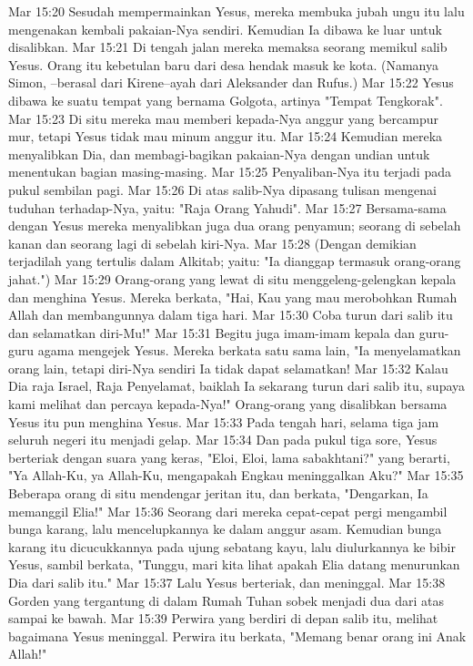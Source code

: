 Mar 15:20  Sesudah mempermainkan Yesus, mereka membuka jubah ungu itu lalu mengenakan kembali pakaian-Nya sendiri. Kemudian Ia dibawa ke luar untuk disalibkan.
Mar 15:21  Di tengah jalan mereka memaksa seorang memikul salib Yesus. Orang itu kebetulan baru dari desa hendak masuk ke kota. (Namanya Simon, --berasal dari Kirene--ayah dari Aleksander dan Rufus.)
Mar 15:22  Yesus dibawa ke suatu tempat yang bernama Golgota, artinya "Tempat Tengkorak".
Mar 15:23  Di situ mereka mau memberi kepada-Nya anggur yang bercampur mur, tetapi Yesus tidak mau minum anggur itu.
Mar 15:24  Kemudian mereka menyalibkan Dia, dan membagi-bagikan pakaian-Nya dengan undian untuk menentukan bagian masing-masing.
Mar 15:25  Penyaliban-Nya itu terjadi pada pukul sembilan pagi.
Mar 15:26  Di atas salib-Nya dipasang tulisan mengenai tuduhan terhadap-Nya, yaitu: "Raja Orang Yahudi".
Mar 15:27  Bersama-sama dengan Yesus mereka menyalibkan juga dua orang penyamun; seorang di sebelah kanan dan seorang lagi di sebelah kiri-Nya.
Mar 15:28  (Dengan demikian terjadilah yang tertulis dalam Alkitab; yaitu: "Ia dianggap termasuk orang-orang jahat.")
Mar 15:29  Orang-orang yang lewat di situ menggeleng-gelengkan kepala dan menghina Yesus. Mereka berkata, "Hai, Kau yang mau merobohkan Rumah Allah dan membangunnya dalam tiga hari.
Mar 15:30  Coba turun dari salib itu dan selamatkan diri-Mu!"
Mar 15:31  Begitu juga imam-imam kepala dan guru-guru agama mengejek Yesus. Mereka berkata satu sama lain, "Ia menyelamatkan orang lain, tetapi diri-Nya sendiri Ia tidak dapat selamatkan!
Mar 15:32  Kalau Dia raja Israel, Raja Penyelamat, baiklah Ia sekarang turun dari salib itu, supaya kami melihat dan percaya kepada-Nya!" Orang-orang yang disalibkan bersama Yesus itu pun menghina Yesus.
Mar 15:33  Pada tengah hari, selama tiga jam seluruh negeri itu menjadi gelap.
Mar 15:34  Dan pada pukul tiga sore, Yesus berteriak dengan suara yang keras, "Eloi, Eloi, lama sabakhtani?" yang berarti, "Ya Allah-Ku, ya Allah-Ku, mengapakah Engkau meninggalkan Aku?"
Mar 15:35  Beberapa orang di situ mendengar jeritan itu, dan berkata, "Dengarkan, Ia memanggil Elia!"
Mar 15:36  Seorang dari mereka cepat-cepat pergi mengambil bunga karang, lalu mencelupkannya ke dalam anggur asam. Kemudian bunga karang itu dicucukkannya pada ujung sebatang kayu, lalu diulurkannya ke bibir Yesus, sambil berkata, "Tunggu, mari kita lihat apakah Elia datang menurunkan Dia dari salib itu."
Mar 15:37  Lalu Yesus berteriak, dan meninggal.
Mar 15:38  Gorden yang tergantung di dalam Rumah Tuhan sobek menjadi dua dari atas sampai ke bawah.
Mar 15:39  Perwira yang berdiri di depan salib itu, melihat bagaimana Yesus meninggal. Perwira itu berkata, "Memang benar orang ini Anak Allah!"
